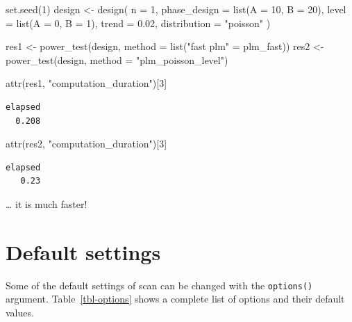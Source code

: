 \documentclass[
  letterpaper,
  DIV=11,
  numbers=noendperiod]{scrreprt}
\newenvironment{Shaded}{\begin{snugshade}}{\end{snugshade}}
\newcommand{\AttributeTok}[1]{\textcolor[rgb]{0.40,0.45,0.13}{#1}}
\newcommand{\DecValTok}[1]{\textcolor[rgb]{0.68,0.00,0.00}{#1}}
\newcommand{\FloatTok}[1]{\textcolor[rgb]{0.68,0.00,0.00}{#1}}
\newcommand{\FunctionTok}[1]{\textcolor[rgb]{0.28,0.35,0.67}{#1}}
\newcommand{\NormalTok}[1]{\textcolor[rgb]{0.00,0.23,0.31}{#1}}
\newcommand{\OtherTok}[1]{\textcolor[rgb]{0.00,0.23,0.31}{#1}}
\newcommand{\StringTok}[1]{\textcolor[rgb]{0.13,0.47,0.30}{#1}}
\begin{document}
\begin{Shaded}
\begin{Highlighting}[]
\FunctionTok{set.seed}\NormalTok{(}\DecValTok{1}\NormalTok{)}
\NormalTok{design }\OtherTok{\textless{}{-}} \FunctionTok{design}\NormalTok{(}
  \AttributeTok{n =} \DecValTok{1}\NormalTok{,}
  \AttributeTok{phase\_design =} \FunctionTok{list}\NormalTok{(}\AttributeTok{A =} \DecValTok{10}\NormalTok{, }\AttributeTok{B =} \DecValTok{20}\NormalTok{),}
  \AttributeTok{level =} \FunctionTok{list}\NormalTok{(}\AttributeTok{A =} \DecValTok{0}\NormalTok{, }\AttributeTok{B =} \DecValTok{1}\NormalTok{),}
  \AttributeTok{trend =} \FloatTok{0.02}\NormalTok{,}
  \AttributeTok{distribution =} \StringTok{"poisson"}
\NormalTok{)}

\NormalTok{res1 }\OtherTok{\textless{}{-}} \FunctionTok{power\_test}\NormalTok{(design, }\AttributeTok{method =} \FunctionTok{list}\NormalTok{(}\StringTok{"fast plm"} \OtherTok{=}\NormalTok{ plm\_fast))}
\NormalTok{res2 }\OtherTok{\textless{}{-}} \FunctionTok{power\_test}\NormalTok{(design, }\AttributeTok{method =} \StringTok{"plm\_poisson\_level"}\NormalTok{)}

\FunctionTok{attr}\NormalTok{(res1, }\StringTok{"computation\_duration"}\NormalTok{)[}\DecValTok{3}\NormalTok{]}
\end{Highlighting}
\end{Shaded}

\begin{verbatim}
elapsed 
  0.208 
\end{verbatim}

\begin{Shaded}
\begin{Highlighting}[]
\FunctionTok{attr}\NormalTok{(res2, }\StringTok{"computation\_duration"}\NormalTok{)[}\DecValTok{3}\NormalTok{]}
\end{Highlighting}
\end{Shaded}

\begin{verbatim}
elapsed 
   0.23 
\end{verbatim}

\ldots{} it is much faster!

\hypertarget{default-settings}{%
\chapter{Default settings}\label{default-settings}}

Some of the default settings of scan can be changed with the
\texttt{options()} argument. Table~\ref{tbl-options} shows a complete
list of options and their default values.
\end{document}
